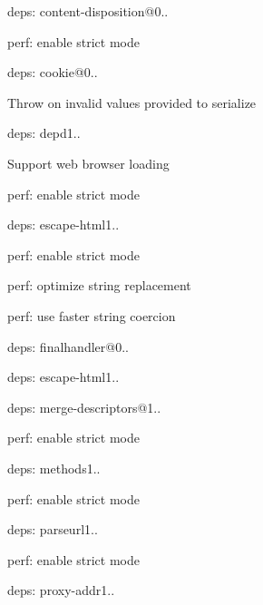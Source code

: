 \begin{DoxyItemize}
\item deps\+: content-\/disposition@0..
\begin{DoxyItemize}
\item perf\+: enable strict mode
\end{DoxyItemize}
\item deps\+: cookie@0..
\begin{DoxyItemize}
\item Throw on invalid values provided to {\ttfamily serialize}
\end{DoxyItemize}
\item deps\+: depd1..
\begin{DoxyItemize}
\item Support web browser loading
\item perf\+: enable strict mode
\end{DoxyItemize}
\item deps\+: escape-\/html1..
\begin{DoxyItemize}
\item perf\+: enable strict mode
\item perf\+: optimize string replacement
\item perf\+: use faster string coercion
\end{DoxyItemize}
\item deps\+: finalhandler@0..
\begin{DoxyItemize}
\item deps\+: escape-\/html1..
\end{DoxyItemize}
\item deps\+: merge-\/descriptors@1..
\begin{DoxyItemize}
\item perf\+: enable strict mode
\end{DoxyItemize}
\item deps\+: methods1..
\begin{DoxyItemize}
\item perf\+: enable strict mode
\end{DoxyItemize}
\item deps\+: parseurl1..
\begin{DoxyItemize}
\item perf\+: enable strict mode
\end{DoxyItemize}
\item deps\+: proxy-\/addr1..
\begin{DoxyItemize}

\end{DoxyItemize}
\end{DoxyItemize}

